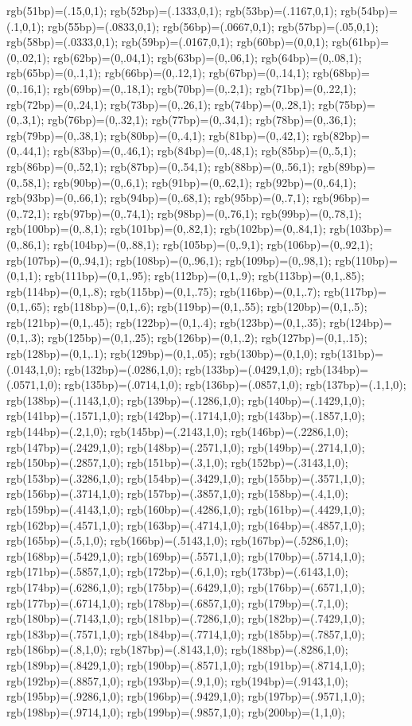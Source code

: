 {{{rgb(51bp)=(.15,0,1); rgb(52bp)=(.1333,0,1); rgb(53bp)=(.1167,0,1); rgb(54bp)=(.1,0,1); rgb(55bp)=(.0833,0,1); rgb(56bp)=(.0667,0,1); rgb(57bp)=(.05,0,1); rgb(58bp)=(.0333,0,1); rgb(59bp)=(.0167,0,1); rgb(60bp)=(0,0,1); rgb(61bp)=(0,.02,1); rgb(62bp)=(0,.04,1); rgb(63bp)=(0,.06,1); rgb(64bp)=(0,.08,1); rgb(65bp)=(0,.1,1); rgb(66bp)=(0,.12,1); rgb(67bp)=(0,.14,1); rgb(68bp)=(0,.16,1); rgb(69bp)=(0,.18,1); rgb(70bp)=(0,.2,1); rgb(71bp)=(0,.22,1); rgb(72bp)=(0,.24,1); rgb(73bp)=(0,.26,1); rgb(74bp)=(0,.28,1); rgb(75bp)=(0,.3,1); rgb(76bp)=(0,.32,1); rgb(77bp)=(0,.34,1); rgb(78bp)=(0,.36,1); rgb(79bp)=(0,.38,1); rgb(80bp)=(0,.4,1); rgb(81bp)=(0,.42,1); rgb(82bp)=(0,.44,1); rgb(83bp)=(0,.46,1); rgb(84bp)=(0,.48,1); rgb(85bp)=(0,.5,1); rgb(86bp)=(0,.52,1); rgb(87bp)=(0,.54,1); rgb(88bp)=(0,.56,1); rgb(89bp)=(0,.58,1); rgb(90bp)=(0,.6,1); rgb(91bp)=(0,.62,1); rgb(92bp)=(0,.64,1); rgb(93bp)=(0,.66,1); rgb(94bp)=(0,.68,1); rgb(95bp)=(0,.7,1); rgb(96bp)=(0,.72,1); rgb(97bp)=(0,.74,1); rgb(98bp)=(0,.76,1); rgb(99bp)=(0,.78,1); rgb(100bp)=(0,.8,1); %
rgb(101bp)=(0,.82,1); rgb(102bp)=(0,.84,1); rgb(103bp)=(0,.86,1); rgb(104bp)=(0,.88,1); rgb(105bp)=(0,.9,1); rgb(106bp)=(0,.92,1); rgb(107bp)=(0,.94,1); rgb(108bp)=(0,.96,1); rgb(109bp)=(0,.98,1); rgb(110bp)=(0,1,1); rgb(111bp)=(0,1,.95); rgb(112bp)=(0,1,.9); rgb(113bp)=(0,1,.85); rgb(114bp)=(0,1,.8); rgb(115bp)=(0,1,.75); rgb(116bp)=(0,1,.7); rgb(117bp)=(0,1,.65); rgb(118bp)=(0,1,.6); rgb(119bp)=(0,1,.55); rgb(120bp)=(0,1,.5); rgb(121bp)=(0,1,.45); rgb(122bp)=(0,1,.4); rgb(123bp)=(0,1,.35); rgb(124bp)=(0,1,.3); rgb(125bp)=(0,1,.25); rgb(126bp)=(0,1,.2); rgb(127bp)=(0,1,.15); rgb(128bp)=(0,1,.1); rgb(129bp)=(0,1,.05); rgb(130bp)=(0,1,0); rgb(131bp)=(.0143,1,0); rgb(132bp)=(.0286,1,0); rgb(133bp)=(.0429,1,0); rgb(134bp)=(.0571,1,0); rgb(135bp)=(.0714,1,0); rgb(136bp)=(.0857,1,0); rgb(137bp)=(.1,1,0); rgb(138bp)=(.1143,1,0); rgb(139bp)=(.1286,1,0); rgb(140bp)=(.1429,1,0); rgb(141bp)=(.1571,1,0); rgb(142bp)=(.1714,1,0); rgb(143bp)=(.1857,1,0); rgb(144bp)=(.2,1,0); rgb(145bp)=(.2143,1,0); rgb(146bp)=(.2286,1,0); rgb(147bp)=(.2429,1,0); rgb(148bp)=(.2571,1,0); rgb(149bp)=(.2714,1,0); rgb(150bp)=(.2857,1,0); %
rgb(151bp)=(.3,1,0); rgb(152bp)=(.3143,1,0); rgb(153bp)=(.3286,1,0); rgb(154bp)=(.3429,1,0); rgb(155bp)=(.3571,1,0); rgb(156bp)=(.3714,1,0); rgb(157bp)=(.3857,1,0); rgb(158bp)=(.4,1,0); rgb(159bp)=(.4143,1,0); rgb(160bp)=(.4286,1,0); rgb(161bp)=(.4429,1,0); rgb(162bp)=(.4571,1,0); rgb(163bp)=(.4714,1,0); rgb(164bp)=(.4857,1,0); rgb(165bp)=(.5,1,0); rgb(166bp)=(.5143,1,0); rgb(167bp)=(.5286,1,0); rgb(168bp)=(.5429,1,0); rgb(169bp)=(.5571,1,0); rgb(170bp)=(.5714,1,0); rgb(171bp)=(.5857,1,0); rgb(172bp)=(.6,1,0); rgb(173bp)=(.6143,1,0); rgb(174bp)=(.6286,1,0); rgb(175bp)=(.6429,1,0); rgb(176bp)=(.6571,1,0); rgb(177bp)=(.6714,1,0); rgb(178bp)=(.6857,1,0); rgb(179bp)=(.7,1,0); rgb(180bp)=(.7143,1,0); rgb(181bp)=(.7286,1,0); rgb(182bp)=(.7429,1,0); rgb(183bp)=(.7571,1,0); rgb(184bp)=(.7714,1,0); rgb(185bp)=(.7857,1,0); rgb(186bp)=(.8,1,0); rgb(187bp)=(.8143,1,0); rgb(188bp)=(.8286,1,0); rgb(189bp)=(.8429,1,0); rgb(190bp)=(.8571,1,0); rgb(191bp)=(.8714,1,0); rgb(192bp)=(.8857,1,0); rgb(193bp)=(.9,1,0); rgb(194bp)=(.9143,1,0); rgb(195bp)=(.9286,1,0); rgb(196bp)=(.9429,1,0); rgb(197bp)=(.9571,1,0); rgb(198bp)=(.9714,1,0); rgb(199bp)=(.9857,1,0); rgb(200bp)=(1,1,0); %
}}}

